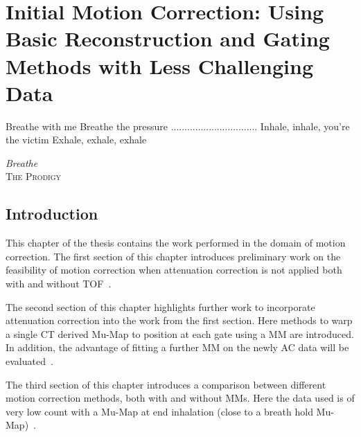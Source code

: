 \chapter{Initial Motion Correction: Using Basic Reconstruction and Gating Methods with Less Challenging Data} \label{sec:initial_motion_correction_using_basic_reconstruction_and_gating_methods_with_less_challenging_data}
    \vspace*{\fill}
    \setlength{\epigraphwidth}{0.4\linewidth}
    \renewcommand{\epigraphflush}{flushright}
    \renewcommand{\epigraphsize}{\footnotesize}
    \epigraph{Breathe with me\newline
              Breathe the pressure\newline
              ................................\newline
              Inhale, inhale, you're the victim\newline
              Exhale, exhale, exhale}%
              {\textit{Breathe}\\ \textsc{The Prodigy}}
    
    \newpage
    
    \section{Introduction} \label{sec:initial_motion_correction_using_basic_reconstruction_and_gating_methods_with_less_challenging_data_introduction}
        This chapter of the thesis contains the work performed in the domain of motion correction. The first section of this chapter introduces preliminary work on the feasibility of motion correction when attenuation correction is not applied both with and without \gls{TOF}~\parencite{Whitehead2019ImpactPET}.
        
        The second section of this chapter highlights further work to incorporate attenuation correction into the work from the first section. Here methods to warp a single \gls{CT} derived \gls{Mu-Map} to position at each gate using a \gls{MM} are introduced. In addition, the advantage of fitting a further \gls{MM} on the newly \gls{AC} data will be evaluated~\parencite{Whitehead2020PET/CTFields}.
        
        The third section of this chapter introduces a comparison between different motion correction methods, both with and without \glspl{MM}. Here the data used is of very low count with a \gls{Mu-Map} at end inhalation (close to a breath hold \gls{Mu-Map})~\parencite{Whitehead2021ComparisonMap}.
        
